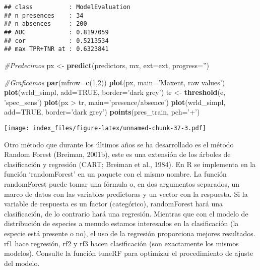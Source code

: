 \documentclass[]{article}
\newenvironment{Shaded}{\begin{snugshade}}{\end{snugshade}}
\newcommand{\KeywordTok}[1]{\textcolor[rgb]{0.13,0.29,0.53}{\textbf{{#1}}}}
\newcommand{\DataTypeTok}[1]{\textcolor[rgb]{0.13,0.29,0.53}{{#1}}}
\newcommand{\DecValTok}[1]{\textcolor[rgb]{0.00,0.00,0.81}{{#1}}}
\newcommand{\StringTok}[1]{\textcolor[rgb]{0.31,0.60,0.02}{{#1}}}
\newcommand{\CommentTok}[1]{\textcolor[rgb]{0.56,0.35,0.01}{\textit{{#1}}}}
\newcommand{\OtherTok}[1]{\textcolor[rgb]{0.56,0.35,0.01}{{#1}}}
\newcommand{\NormalTok}[1]{{#1}}
\begin{document}
\begin{verbatim}
## class          : ModelEvaluation 
## n presences    : 34 
## n absences     : 200 
## AUC            : 0.8197059 
## cor            : 0.5213534 
## max TPR+TNR at : 0.6323841
\end{verbatim}

\begin{Shaded}
\begin{Highlighting}[]
\CommentTok{#Predecimos}
\NormalTok{px <-}\StringTok{ }\KeywordTok{predict}\NormalTok{(predictors, mx, }\DataTypeTok{ext=}\NormalTok{ext, }\DataTypeTok{progress=}\StringTok{''}\NormalTok{)}

\CommentTok{#Graficamos}
\KeywordTok{par}\NormalTok{(}\DataTypeTok{mfrow=}\KeywordTok{c}\NormalTok{(}\DecValTok{1}\NormalTok{,}\DecValTok{2}\NormalTok{))}
\KeywordTok{plot}\NormalTok{(px, }\DataTypeTok{main=}\StringTok{'Maxent, raw values'}\NormalTok{)}
\KeywordTok{plot}\NormalTok{(wrld_simpl, }\DataTypeTok{add=}\OtherTok{TRUE}\NormalTok{, }\DataTypeTok{border=}\StringTok{'dark grey'}\NormalTok{)}
\NormalTok{tr <-}\StringTok{ }\KeywordTok{threshold}\NormalTok{(e, }\StringTok{'spec_sens'}\NormalTok{)}
\KeywordTok{plot}\NormalTok{(px >}\StringTok{ }\NormalTok{tr, }\DataTypeTok{main=}\StringTok{'presence/absence'}\NormalTok{)}
\KeywordTok{plot}\NormalTok{(wrld_simpl, }\DataTypeTok{add=}\OtherTok{TRUE}\NormalTok{, }\DataTypeTok{border=}\StringTok{'dark grey'}\NormalTok{)}
\KeywordTok{points}\NormalTok{(pres_train, }\DataTypeTok{pch=}\StringTok{'+'}\NormalTok{)}
\end{Highlighting}
\end{Shaded}

\texttt{[image: index\_files/figure-latex/unnamed-chunk-37-3.pdf]}

Otro método que durante los últimos años se ha desarrollado es el método
Random Forest (Breiman, 2001b), este es una extensión de los árboles de
clasificación y regresión (CART; Breiman et al., 1984). En R se
implementa en la función `randomForest' en un paquete con el mismo
nombre. La función randomForest puede tomar una fórmula o, en dos
argumentos separados, un marco de datos con las variables predictoras y
un vector con la respuesta. Si la variable de respuesta es un factor
(categórico), randomForest hará una clasificación, de lo contrario hará
una regresión. Mientras que con el modelo de distribución de especies a
menudo estamos interesados en la clasificación (la especie está presente
o no), el uso de la regresión proporciona mejores resultados. rf1 hace
regresión, rf2 y rf3 hacen clasificación (son exactamente los mismos
modelos). Consulte la función tuneRF para optimizar el procedimiento de
ajuste del modelo.
\end{document}

